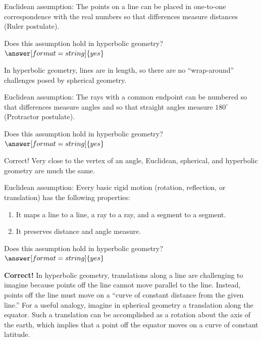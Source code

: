 \documentclass{ximera}
\begin{document}
\begin{problem} %
Euclidean assumption:  The points on a line can be placed in one-to-one correspondence with the real numbers so that differences measure distances (Ruler postulate).  

Does this assumption hold in hyperbolic geometry? 
$\answer[format=string]{yes}$
\begin{feedback}[correct]
In hyperbolic geometry, lines are  in length, so there are no ``wrap-around'' challenges posed by spherical geometry.  
\end{feedback}
\end{problem}

\begin{problem} %
Euclidean assumption:  The rays with a common endpoint can be numbered so that differences measure angles and so that straight angles measure $180^\circ$ (Protractor postulate).  

Does this assumption hold in hyperbolic geometry? 
$\answer[format=string]{yes}$
\begin{feedback}[correct]
Correct!  Very close to the vertex of an angle, Euclidean, spherical, and hyperbolic geometry are much the same.  
\end{feedback}
\end{problem}

\begin{problem} %
Euclidean assumption: Every basic rigid motion (rotation, reflection, or translation) has the following properties: 
\begin{enumerate}
\item It maps a line to a line, a ray to a ray, and a segment to a segment.
\item It preserves distance and angle measure.
\end{enumerate}

Does this assumption hold in hyperbolic geometry? 
$\answer[format=string]{yes}$
\begin{feedback}[correct]
\textbf{Correct!} In hyperbolic geometry, translations along a line are challenging to imagine because points off the line cannot move parallel to the line.  Instead, points off the line must move on a ``curve of constant distance from the given line.''  For a useful analogy, imagine in spherical geometry a translation along the equator.  Such a translation can be accomplished as a rotation about the axis of the earth, which implies that a point off the equator moves on a curve of constant latitude.
\end{feedback}
\end{problem}
\end{document}
